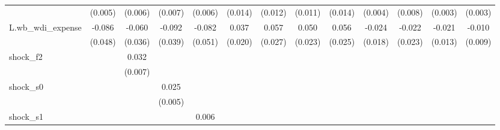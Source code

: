 {\begin{tabular}{l*{12}{c}}
            &     (0.005)         &     (0.006)         &     (0.007)         &     (0.006)         &     (0.014)         &     (0.012)         &     (0.011)         &     (0.014)         &     (0.004)         &     (0.008)         &     (0.003)         &     (0.003)         \\
\addlinespace
L.wb\_wdi\_expense&      -0.086\sym{*}  &      -0.060         &      -0.092\sym{**} &      -0.082         &       0.037\sym{*}  &       0.057\sym{**} &       0.050\sym{**} &       0.056\sym{**} &      -0.024         &      -0.022         &      -0.021         &      -0.010         \\
            &     (0.048)         &     (0.036)         &     (0.039)         &     (0.051)         &     (0.020)         &     (0.027)         &     (0.023)         &     (0.025)         &     (0.018)         &     (0.023)         &     (0.013)         &     (0.009)         \\
\addlinespace
shock\_f2    &                     &       0.032\sym{***}&                     &                     &                     &                     &                     &                     &                     &                     &                     &                     \\
            &                     &     (0.007)         &                     &                     &                     &                     &                     &                     &                     &                     &                     &                     \\
\addlinespace
shock\_s0    &                     &                     &       0.025\sym{***}&                     &                     &                     &                     &                     &                     &                     &                     &                     \\
            &                     &                     &     (0.005)         &                     &                     &                     &                     &                     &                     &                     &                     &                     \\
\addlinespace
shock\_s1    &                     &                     &                     &       0.006\sym{*}  &                     &                     &                     &                     &                     &                     &                     &                     \\

\end{tabular}}
